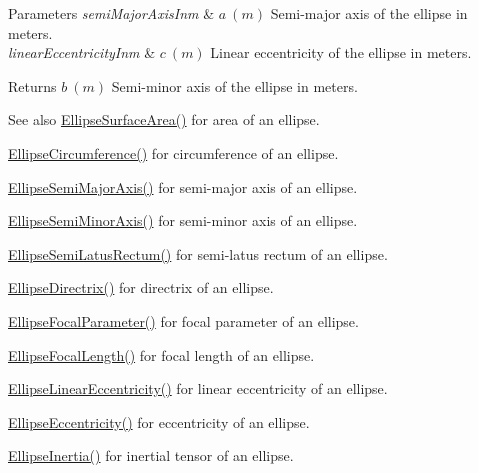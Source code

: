 \begin{DoxyParams}{Parameters}
{\em semi\+Major\+Axis\+Inm} & $ a\ (m)$ Semi-\/major axis of the ellipse in meters. \\
\hline
{\em linear\+Eccentricity\+Inm} & $ c\ (m)$ Linear eccentricity of the ellipse in meters. \\
\hline
\end{DoxyParams}
\begin{DoxyReturn}{Returns}
$ b\ (m)$ Semi-\/minor axis of the ellipse in meters. 
\end{DoxyReturn}
\begin{DoxySeeAlso}{See also}
\mbox{\hyperlink{group___e_g_x_math-_geometry-2_d-_ellipse-_surface_area_ga4ce8c8323e9718ce5458f4ab7f6d823d}{Ellipse\+Surface\+Area()}} for area of an ellipse. 

\mbox{\hyperlink{group___e_g_x_math-_geometry-2_d-_ellipse-_circumference_ga4172802ac674eb53467b44928ac635c7}{Ellipse\+Circumference()}} for circumference of an ellipse. 

\mbox{\hyperlink{group___e_g_x_math-_geometry-2_d-_ellipse-_semi_major_axis_ga646a2ca065f4ac3f666a9ea22f3bb527}{Ellipse\+Semi\+Major\+Axis()}} for semi-\/major axis of an ellipse. 

\mbox{\hyperlink{group___e_g_x_math-_geometry-2_d-_ellipse-_semi_minor_axis_gae461acf3333565d69527dd86e9aa2b32}{Ellipse\+Semi\+Minor\+Axis()}} for semi-\/minor axis of an ellipse. 

\mbox{\hyperlink{group___e_g_x_math-_geometry-2_d-_ellipse-_semi_latus_rectum_gacfd1844eb4ef3d1ee3c0b460a6442ae6}{Ellipse\+Semi\+Latus\+Rectum()}} for semi-\/latus rectum of an ellipse. 

\mbox{\hyperlink{group___e_g_x_math-_geometry-2_d-_ellipse-_directrix_gace8f72a8efbc9c18d3eb689151405106}{Ellipse\+Directrix()}} for directrix of an ellipse. 

\mbox{\hyperlink{group___e_g_x_math-_geometry-2_d-_ellipse-_focal_parameter_ga4cd01a38c72c092ef9791351948bf69b}{Ellipse\+Focal\+Parameter()}} for focal parameter of an ellipse. 

\mbox{\hyperlink{group___e_g_x_math-_geometry-2_d-_ellipse-_focal_length_gab8d63de7640c880cfecaeada6f2afdac}{Ellipse\+Focal\+Length()}} for focal length of an ellipse. 

\mbox{\hyperlink{group___e_g_x_math-_geometry-2_d-_ellipse-_linear_eccentricity_gac70b3010e30aa8b73deb50fe2b9b9a91}{Ellipse\+Linear\+Eccentricity()}} for linear eccentricity of an ellipse. 

\mbox{\hyperlink{group___e_g_x_math-_geometry-2_d-_ellipse-_eccentricity_ga6a0a7fba17f782616894cfc447628c33}{Ellipse\+Eccentricity()}} for eccentricity of an ellipse. 

\mbox{\hyperlink{group___e_g_x_math-_geometry-2_d-_ellipse-_inertia_ga10a3049c2f04b50f271fb01dc62e4cf8}{Ellipse\+Inertia()}} for inertial tensor of an ellipse. 
\end{DoxySeeAlso}
